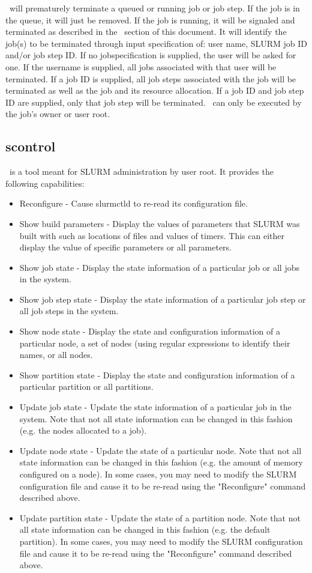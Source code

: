 \scancel\ will prematurely terminate a queued or running job or job step.
If the job is in the queue, it will just be removed.  If the job is
running, it will be signaled and terminated as described in the \slurmd\
section of this document.  It will identify the job(s) to be terminated
through input specification of: user name, SLURM job ID and/or job step ID. 
If no jobspecification is supplied, the user will be asked for one.  
If the username is supplied, all jobs associated with that user will be terminated. 
If a job ID is supplied, all job steps associated with the job will be terminated 
as well as the job and its resource allocation. 
If a job ID and job step ID are supplied, only that job step will be terminated.
\scancel\ can only be executed by the job's owner or user root.

\subsection{scontrol}

\scontrol\ is a tool meant for SLURM administration by user root. 
It provides the following capabilities:
\begin{itemize}
\item Reconfigure - Cause slurmctld to re-read its configuration file.
\item Show build parameters - Display the values of parameters that SLURM 
was built with such as locations of files and values of timers. This can 
either display the value of specific parameters or all parameters.
\item Show job state - Display the state information of a particular job 
or all jobs in the system.
\item Show job step state - Display the state information of a particular 
job step or all job steps in the system.
\item Show node state - Display the state and configuration information 
of a particular node, a set of nodes (using regular expressions to 
identify their names, or all nodes.
\item Show partition state - Display the state and configuration information 
of a particular partition or all partitions.
\item Update job state - Update the state information of a particular job 
in the system. Note that not all state information can be changed in this 
fashion (e.g. the nodes allocated to a job).
\item Update node state - Update the state of a particular node. Note that 
not all state information can be changed in this fashion (e.g. the amount 
of memory configured on a node). In some cases, you may need to modify 
the SLURM configuration file and cause it to be re-read using the "Reconfigure" 
command described above.
\item Update partition state - Update the state of a partition node. Note that 
not all state information can be changed in this fashion (e.g. the default 
partition). In some cases, you may need to modify the SLURM configuration 
file and cause it to be re-read using the "Reconfigure" command described above.
\end{itemize}

